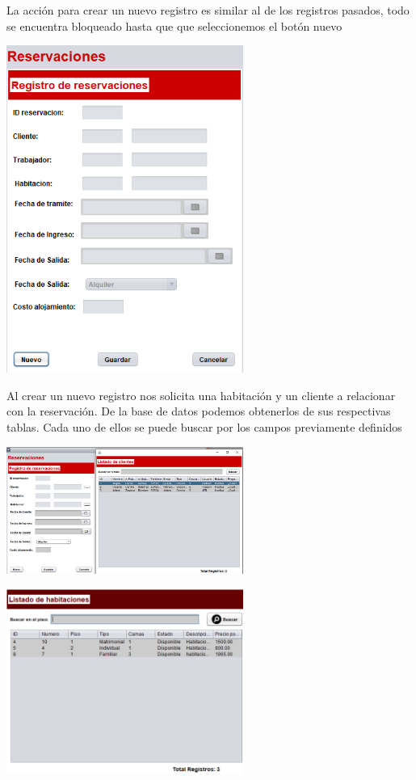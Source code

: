 \documentclass[12pt]{article}
\begin{document}
\begin{flushleft}
\vspace{0.5cm}
\textsf{La acción para crear un nuevo registro es similar al de los registros pasados, todo se encuentra bloqueado hasta que que seleccionemos el botón nuevo}
\vspace{0.5cm}
\begin{center}
\includegraphics[width=7.75cm]{reservacion.png}
\end{center}

\vspace{0.5cm}
\textsf{Al crear un nuevo registro nos solicita una habitación y un cliente a relacionar con la reservación. De la base de datos podemos obtenerlos de sus respectivas tablas. Cada uno de ellos se puede buscar por los campos previamente definidos}
\vspace{0.5cm}
\begin{center}
\includegraphics[width=7.75cm]{reserva_cliente.png}
\end{center}
\begin{center}
\includegraphics[width=7.75cm]{lis_habitacion.png}
\end{center}


\end{flushleft}
\end{document}
